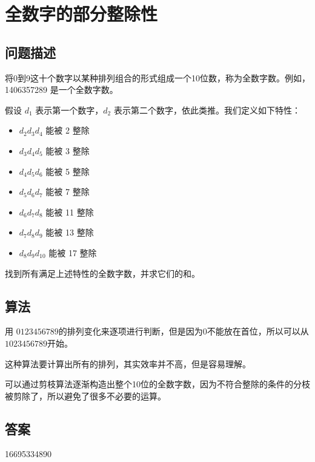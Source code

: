 \section{全数字的部分整除性}\label{sec:problem43}
\subsection{问题描述}
\begin{tcolorbox}
	将0到9这十个数字以某种排列组合的形式组成一个10位数，称为全数字数。例如，1406357289 是一个全数字数。

	假设 \( d_1 \) 表示第一个数字，\( d_2 \) 表示第二个数字，依此类推。我们定义如下特性：

	\begin{itemize}
		\item \( d_2d_3d_4 \) 能被 2 整除
		\item \( d_3d_4d_5 \) 能被 3 整除
		\item \( d_4d_5d_6 \) 能被 5 整除
		\item \( d_5d_6d_7 \) 能被 7 整除
		\item \( d_6d_7d_8 \) 能被 11 整除
		\item \( d_7d_8d_9 \) 能被 13 整除
		\item \( d_8d_9d_{10} \) 能被 17 整除
	\end{itemize}

	找到所有满足上述特性的全数字数，并求它们的和。

\end{tcolorbox}

\subsection{算法}
用 \( 0123456789 \)的排列变化来逐项进行判断，但是因为0不能放在首位，所以可以从 \( 1023456789 \)开始。

这种算法要计算出所有的排列，其实效率并不高，但是容易理解。

可以通过剪枝算法逐渐构造出整个10位的全数字数，因为不符合整除的条件的分枝被剪除了，所以避免了很多不必要的运算。

\subsection{答案}
16695334890
